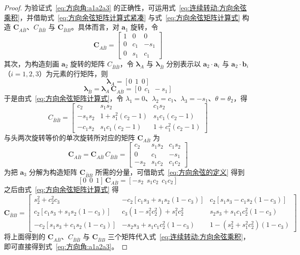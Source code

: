 \begin{proof}
    为验证式~\eqref{eq:方向角:a1a2a3} 的正确性，可运用式~\eqref{eq:连续转动:方向余弦乘积}，并借助式~\eqref{eq:方向余弦矩阵计算式紧凑} 与式~\eqref{eq:方向余弦矩阵计算式} 构造 $\bm{C}_{A\bar B}$、$C_{\bar B\bar B}$ 与 $\bm{C}_{\bar B B}$。具体而言，对 $\mathbf{a}_1$ 旋转，令
$$
\bm{C}_{A\bar B}=\begin{bmatrix}1&0&0\\0&c_1&-s_1\\0&s_1&c_1\end{bmatrix}
$$
其次，为构造刻画 $\mathbf{a}_2$ 旋转的矩阵 $C_{\bar B\bar B}$，令 $\bm{\lambda}_A$ 与 $\bm{\lambda}_{\bar B}$ 分别表示以 $\mathbf{a}_2\cdot\mathbf{a}_i$ 与 $\mathbf{a}_2\cdot\mathbf{b}_i$（$i=1,2,3$）为元素的行矩阵，则
$$
\bm{\lambda}_A=[0\ \ 1\ \ 0]
$$
$$
\bm{\lambda}_{\bar B}=\bm{\lambda}_A\,\bm{C}_{A\bar B}=[0\ \ c_1\ \ -s_1]
$$
于是由式~\eqref{eq:方向余弦矩阵计算式}，令 $\lambda_1=0$、$\lambda_2=c_1$、$\lambda_3=-s_1$、$\theta=\theta_2$，得
$$
C_{\bar B\bar B}=\begin{bmatrix}c_2&s_1s_2&c_1s_2\\-s_1s_2&1+s_1^2(c_2-1)&s_1c_1(c_2-1)\\-c_1s_2&s_1c_1(c_2-1)&1+c_1^2(c_2-1)\end{bmatrix}
$$
与头两次旋转等价的单次旋转所对应的矩阵 $\bm{C}_{A\bar B}$ 为
$$
\bm{C}_{A\bar B}=\bm{C}_{A\bar B}\,C_{\bar B\bar B}=\begin{bmatrix}c_2&s_1s_2&c_1s_2\\0&c_1&-s_1\\-s_2&s_1c_2&c_1c_2\end{bmatrix}
$$
为把 $\mathbf{a}_3$ 分解为构造矩阵 $\bm{C}_{\bar B B}$ 所需的分量，可借助式~\eqref{eq:方向余弦的定义} 得到
$$
[0\ \ 0\ \ 1]\,\bm{C}_{A\bar B}=[-s_2\ \ s_1c_2\ \ c_1c_2]
$$
之后由式~\eqref{eq:方向余弦矩阵计算式} 得
$$
\bm{C}_{\bar B B}=\begin{bmatrix}s_2^2+c_2^2c_3&-c_2[c_1s_3+s_1s_2(1-c_3)]&c_2[s_1s_3-c_1s_2(1-c_3)]\\c_2[c_1s_3+s_1s_2(1-c_3)]&c_3(1-s_1^2c_2^2)+s_1^2c_2^2&s_2s_3+s_1c_1c_2^2(1-c_3)\\-c_2[s_1s_3+c_1s_2(1-c_3)]&-s_2s_3+s_1c_1c_2^2(1-c_3)&1-(s_2^2+s_1^2c_2^2)(1-c_3)\end{bmatrix}
$$
将上面得到的 $\bm{C}_{A\bar B}$、$C_{\bar B\bar B}$ 与 $\bm{C}_{\bar B B}$ 三个矩阵代入式~\eqref{eq:连续转动:方向余弦乘积}，即可直接得到式~\eqref{eq:方向角:a1a2a3}。


\end{proof}
